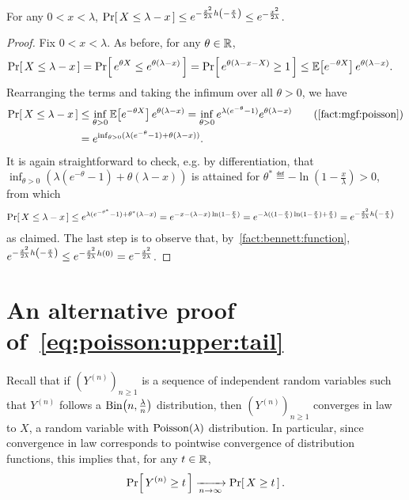 \documentclass[10pt]{article}
\newcommand{\bennettfunc}{h}
\newcommand{\bennett}[1]{\bennettfunc\mleft(#1\mright)}
\begin{document}
\begin{fact}\label{fact:poisson:lower:tail}
  For any $0 < x< \lambda$, $\probaOf{ X \leq \lambda - x} \leq e^{-\frac{x^2}{2\lambda}\bennett{-\frac{x}{\lambda}}}\leq e^{-\frac{x^2}{2\lambda}}$.
\end{fact}
\begin{proof}
Fix $0 < x< \lambda$. As before, for any $\theta\in\mathbb{R}$,
\begin{align*}
    \Pr\!\left[\,  X \leq \lambda - x\, \right]
    &= \Pr\!\left[\,  e^{\theta X} \leq e^{\theta(\lambda - x)} \, \right]
    = \Pr\!\left[\,  e^{\theta(\lambda -x - X)} \geq 1\, \right]
    \leq \mathbb{E}\!\left[ e^{-\theta X} \right] e^{\theta(\lambda -x) }. 
\end{align*}
Rearranging the terms and taking the infimum over all $\theta > 0$, we have
\begin{align*}
    \probaOf{ X \leq \lambda - x}
    &\leq \inf_{\theta > 0}\expect{ e^{-\theta X} }e^{\theta(\lambda-x)} = \inf_{\theta > 0}e^{\lambda(e^{-\theta}-1)}e^{\theta(\lambda-x)} \tag{\autoref{fact:mgf:poisson}} \\
    &= e^{\inf_{\theta > 0}( \lambda(e^{-\theta}-1) + \theta(\lambda-x))}.
\end{align*}
It is again straightforward to check, e.g. by differentiation, that $\inf_{\theta > 0}( \lambda(e^{-\theta}-1) + \theta(\lambda-x))$ is attained for $\theta^\ast \eqdef -\ln(1-\frac{x}{\lambda}) > 0$, from which
\begin{align*}
    \probaOf{ X \leq \lambda - x}
    &\leq e^{\lambda(e^{-\theta^\ast}-1) +\theta^\ast(\lambda-x)}
    = e^{-x -(\lambda-x)\ln(1-\frac{x}{\lambda})} 
    = e^{-\lambda( (1-\frac{x}{\lambda})\ln(1-\frac{x}{\lambda}) + \frac{x}{\lambda})} 
    = e^{-\frac{x^2}{2\lambda}\bennett{-\frac{x}{\lambda}}} 
\end{align*}
as claimed. The last step is to observe that, by~\autoref{fact:bennett:function}, $e^{-\frac{x^2}{2\lambda}\bennett{-\frac{x}{\lambda}}} \leq e^{-\frac{x^2}{2\lambda}\bennett{0}} = e^{-\frac{x^2}{2\lambda}}$.
\end{proof}

\section{An alternative proof of~\eqref{eq:poisson:upper:tail}}
Recall that if $(Y^{(n)})_{n\geq 1}$ is a sequence of independent random variables such that $Y^{(n)}$ follows a $\operatorname{Bin}\!\left( n, \frac{\lambda}{n} \right)$ distribution, then $(Y^{(n)})_{n\geq 1}$ converges in law to $X$, a random variable with $\operatorname{Poisson}\!\left( \lambda \right) $ distribution.\footnotemark{} In particular, since convergence in law corresponds to pointwise convergence of distribution functions, this implies that, for any $t\in \mathbb{R}$,
\begin{equation}\label{eq:convergence:law:poisson}
  \Pr\!\left[\, Y^{(n)} \geq t \, \right] \xrightarrow[n\to\infty]{}  \Pr\!\left[\, X \geq t \, \right].
\end{equation}
\end{document}
